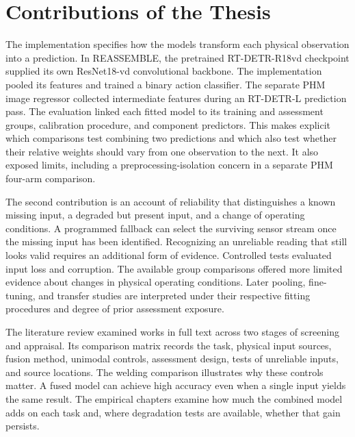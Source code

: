 \section{Contributions of the Thesis}
The implementation specifies how the models transform each physical observation into a prediction. In REASSEMBLE, the pretrained RT-DETR-R18vd checkpoint supplied its own ResNet18-vd convolutional backbone. The implementation pooled its features and trained a binary action classifier. The separate PHM image regressor collected intermediate features during an RT-DETR-L prediction pass. The evaluation linked each fitted model to its training and assessment groups, calibration procedure, and component predictors. This makes explicit which comparisons test combining two predictions and which also test whether their relative weights should vary from one observation to the next. It also exposed limits, including a preprocessing-isolation concern in a separate PHM four-arm comparison.

The second contribution is an account of reliability that distinguishes a known missing input, a degraded but present input, and a change of operating conditions. A programmed fallback can select the surviving sensor stream once the missing input has been identified. Recognizing an unreliable reading that still looks valid requires an additional form of evidence. Controlled tests evaluated input loss and corruption. The available group comparisons offered more limited evidence about changes in physical operating conditions. Later pooling, fine-tuning, and transfer studies are interpreted under their respective fitting procedures and degree of prior assessment exposure.

The literature review examined \ReviewWorkCount{} works in full text across two stages of screening and appraisal. Its comparison matrix records the task, physical input sources, fusion method, unimodal controls, assessment design, tests of unreliable inputs, and source locations. The welding comparison illustrates why these controls matter. A fused model can achieve high accuracy even when a single input yields the same result. The empirical chapters examine how much the combined model adds on each task and, where degradation tests are available, whether that gain persists.

